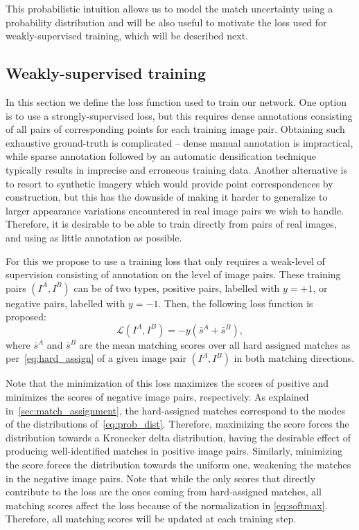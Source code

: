 \documentclass{article}
\begin{document}
This probabilistic intuition allows us to model the match uncertainty using a probability distribution and  will be also useful to motivate the loss used for weakly-supervised training, which will be described next.

\subsection{Weakly-supervised training}
In this section we define the loss function used to train our network.
One option is to use a strongly-supervised loss, but this requires dense annotations consisting of all pairs of corresponding points for each training image pair. Obtaining such exhaustive ground-truth is complicated -- dense manual annotation is impractical, while sparse annotation followed by an automatic densification technique typically results in imprecise and erroneous training data. Another alternative is to resort to synthetic imagery which would provide point correspondences by construction, but this has the downside of making it harder to generalize to larger appearance variations encountered in real image pairs we wish to handle. Therefore, it is desirable to be able to train directly from pairs of real images, and using as little annotation as possible. 

For this we propose to use a training loss that only requires a weak-level of supervision consisting of annotation on the level of image pairs.  These training pairs $(I^A,I^B)$ can be of two types, positive pairs, labelled with $y=+1$, or negative pairs, labelled with $y=-1$. Then, the following loss function is proposed:
\begin{equation}
    \mathcal{L}(I^A,I^B)=-y\left(\bar{s}^A + \bar{s}^B\right),
    \label{eq:loss}
\end{equation}
where $\bar{s}^A$ and $\bar{s}^B$ are the mean matching scores over all hard assigned matches as per~\eqref{eq:hard_assign} of a given image pair $(I^A,I^B)$ in both matching directions.

Note that the minimization of this loss maximizes the scores of positive and minimizes the scores of negative image pairs, respectively. As explained in~\ref{sec:match_assignment}, the hard-assigned matches correspond to the modes of the distributions of~\eqref{eq:prob_dist}. Therefore, maximizing the score forces the distribution towards a Kronecker delta distribution, having the desirable effect of producing well-identified matches in positive image pairs. Similarly, minimizing the score forces the distribution towards the uniform one, weakening the matches in the negative image pairs. Note that while the only scores that directly contribute to the loss are the ones coming from hard-assigned matches, all matching scores affect the loss because of the normalization in \eqref{eq:softmax}. Therefore, all matching scores will be updated at each training step.
\end{document}
